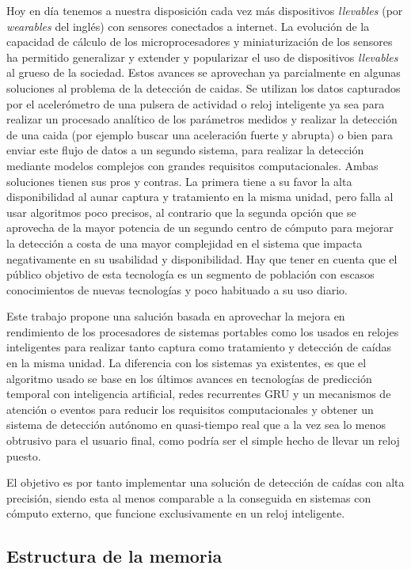 \documentclass[../tfm.tex]{subfiles}
\begin{document}
Hoy en día tenemos a nuestra disposición cada vez más dispositivos \textit{llevables} (por \textit{wearables} del inglés) con sensores conectados a internet. La evolución de la capacidad de cálculo de los microprocesadores y miniaturización de los sensores ha permitido generalizar y extender y popularizar el uso de dispositivos \textit{llevables} al grueso de la sociedad. Estos avances se aprovechan ya parcialmente en algunas soluciones al problema de la detección de caidas. Se utilizan los datos capturados por el acelerómetro de una pulsera de actividad o reloj inteligente ya sea para realizar un procesado analítico de los parámetros medidos y realizar la detección de una caida (por ejemplo buscar una aceleración fuerte y abrupta) o bien para enviar este flujo de datos a un segundo sistema, para realizar la detección mediante modelos complejos con grandes requisitos computacionales. Ambas soluciones tienen sus pros y contras. La primera tiene a su favor la alta disponibilidad al aunar captura y tratamiento en la misma unidad, pero falla al usar algoritmos poco precisos, al contrario que la segunda opción que se aprovecha de la mayor potencia de un segundo centro de cómputo para mejorar la detección a costa de una mayor complejidad en el sistema que impacta negativamente en su usabilidad y disponibilidad. Hay que tener en cuenta que el público objetivo de esta tecnología es un segmento de población con escasos conocimientos de nuevas tecnologías y poco habituado a su uso diario.

Este trabajo propone una salución basada en aprovechar la mejora en rendimiento de los procesadores de sistemas portables como los usados en relojes inteligentes para realizar tanto captura como tratamiento y detección de caídas en la misma unidad. La diferencia con los sistemas ya existentes, es que el algoritmo usado se base en los últimos avances en tecnologías de predicción temporal con inteligencia artificial, redes recurrentes GRU y un mecanismos de atención o eventos para reducir los requisitos computacionales y obtener  un sistema de detección autónomo en quasi-tiempo real que a la vez sea lo menos obtrusivo para el usuario final, como podría ser el simple hecho de llevar un reloj puesto.

El objetivo es por tanto implementar una solución de detección de caídas con alta precisión, siendo esta al menos comparable a la conseguida en sistemas con cómputo externo, que funcione exclusivamente en un reloj inteligente.


\subsection{Estructura de la memoria}
\end{document}

